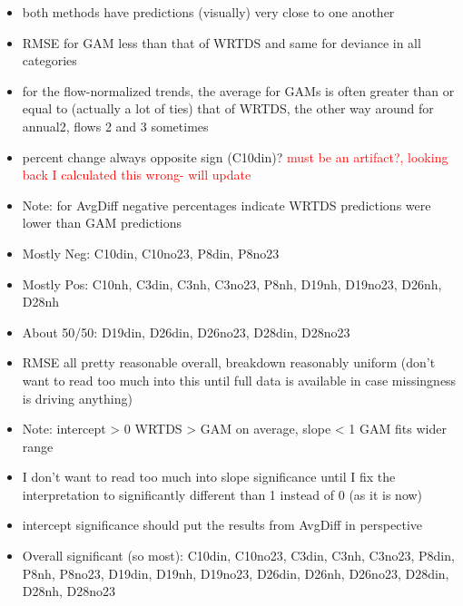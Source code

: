 \documentclass[12pt]{amsart}
\begin{document}
\begin{itemize}
\item both methods have predictions (visually) very close to one another
\item RMSE for GAM less than that of WRTDS and same for deviance in all categories 
\item for the flow-normalized trends, the average for GAMs is often greater than or equal to (actually a lot of ties) that of WRTDS, the other way around for annual2, flows 2 and 3 sometimes 
\item percent change always opposite sign (C10din)? \textcolor{red}{must be an artifact?, looking back I calculated this wrong- will update}
\item  Note: for  AvgDiff negative percentages indicate WRTDS predictions were lower than GAM predictions
\item Mostly Neg: C10din, C10no23, P8din, P8no23
\item Mostly Pos: C10nh, C3din, C3nh, C3no23, P8nh, D19nh, D19no23, D26nh, D28nh
\item About 50/50: D19din, D26din, D26no23, D28din, D28no23
\item RMSE all pretty reasonable overall, breakdown reasonably uniform (don't want to read too much into this until full data is available in case missingness is driving anything)
\item Note: intercept > 0 WRTDS > GAM on average, slope < 1 GAM fits wider range
\item I don't want to read too much into slope significance until I fix the interpretation to significantly different than 1 instead of 0 (as it is now)
\item intercept significance should put the results from AvgDiff in perspective
\item Overall significant (so most): C10din, C10no23, C3din, C3nh, C3no23, P8din, P8nh, P8no23, D19din, D19nh, D19no23, D26din, D26nh, D26no23, D28din, D28nh, D28no23
\end{itemize}
\end{document}
